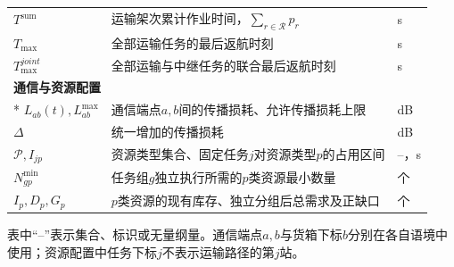 \begin{longtable}{@{}p{3.0cm}p{\dimexpr\textwidth-4.8cm-4\tabcolsep\relax}p{1.8cm}@{}}
$T^{\mathrm{sum}}$ & 运输架次累计作业时间，$\sum_{r\in\mathcal R}p_r$ & s\\
$T_{\max}$ & 全部运输任务的最后返航时刻 & s\\
$T_{\max}^{joint}$ & 全部运输与中继任务的联合最后返航时刻 & s\\
\midrule
\multicolumn{3}{l}{\textbf{通信与资源配置}}\\*
$L_{ab}(t),L_{ab}^{\max}$ & 通信端点$a,b$间的传播损耗、允许传播损耗上限 & dB\\
$\Delta$ & 统一增加的传播损耗 & dB\\
$\mathcal P,I_{jp}$ & 资源类型集合、固定任务$j$对资源类型$p$的占用区间 & --，s\\
$N_{gp}^{\min}$ & 任务组$g$独立执行所需的$p$类资源最小数量 & 个\\
$I_p,D_p,G_p$ & $p$类资源的现有库存、独立分组后总需求及正缺口 & 个\\
\end{longtable}
\endgroup

表中“--”表示集合、标识或无量纲量。通信端点$a,b$与货箱下标$b$分别在各自语境中使用；资源配置中任务下标$j$不表示运输路径的第$j$站。
